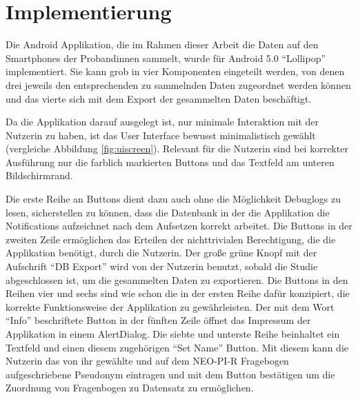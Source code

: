 
\chapter{Implementierung}
\label{ch:Implementierung}
Die Android Applikation, die im Rahmen dieser Arbeit die Daten auf den Smartphones der Probandinnen sammelt, wurde für Android 5.0 "`Lollipop"' implementiert.
Sie kann grob in vier Komponenten eingeteilt werden, von denen drei jeweils den entsprechenden zu sammelnden Daten zugeordnet werden können und das vierte sich mit dem Export der gesammelten Daten beschäftigt.

Da die Applikation darauf ausgelegt ist, nur minimale Interaktion mit der Nutzerin zu haben,
ist das User Interface bewusst minimalistisch gewählt (vergleiche Abbildung \ref{fig:uiscreen}).
Relevant für die Nutzerin sind bei korrekter Ausführung nur die farblich markierten Buttons und das Textfeld am unteren Bildschirmrand.

Die erste Reihe an Buttons dient dazu auch ohne die Möglichkeit Debuglogs zu lesen, sicherstellen zu können, dass die Datenbank in der die Applikation die Notifications aufzeichnet nach dem Aufsetzen korrekt arbeitet.
Die Buttons in der zweiten Zeile ermöglichen das Erteilen der nichttrivialen Berechtigung, die die Applikation benötigt, durch die Nutzerin.
Der große grüne Knopf mit der Aufschrift "`DB Export"' wird von der Nutzerin benutzt, sobald die Studie abgeschlossen ist, um die gesammelten Daten zu exportieren.
Die Buttons in den Reihen vier und sechs sind wie schon die in der ersten Reihe dafür konzipiert, die korrekte Funktionsweise der Applikation zu gewährleisten.
Der mit dem Wort "`Info"' beschriftete Button in der fünften Zeile öffnet das Impressum der Applikation in einem AlertDialog.
Die siebte und unterste Reihe beinhaltet ein Textfeld und einen diesem zugehörigen "`Set Name"' Button.
Mit diesem kann die Nutzerin das von ihr gewählte und auf dem NEO-PI-R Fragebogen aufgeschriebene Pseudonym eintragen und mit dem Button bestätigen um die Zuordnung von Fragenbogen zu Datensatz zu ermöglichen.


